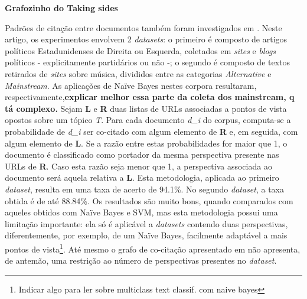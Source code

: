 \textbf{Grafozinho do Taking sides}

Padrões de citação entre documentos também foram investigados em \cite{efron}. Neste artigo, os experimentos envolvem 2 \emph{datasets}: o primeiro é composto de artigos políticos Estadunidenses de Direita ou Esquerda, coletados em \emph{sites} e \emph{blogs} políticos - explicitamente partidários ou não -; o segundo é composto de textos retirados de \emph{sites} sobre música, divididos entre as categorias \emph{Alternative} e \emph{Mainstream}. As aplicações de Naïve Bayes nestes corpora resultaram, respectivamente,\textbf{explicar melhor essa parte da coleta dos mainstream, q tá complexo.}
Sejam \textbf{L} e \textbf{R} duas listas de URLs associadas a pontos de vista opostos sobre um tópico \emph{T}. Para cada documento \emph{d\_i} do corpus, computa-se a probabilidade de \emph{d\_i} ser co-citado com algum elemento de \textbf{R} e, em seguida, com algum elemento de \textbf{L}. Se a razão entre estas probabilidades for maior que 1, o documento é classificado como portador da mesma perspectiva presente nas URLs de \textbf{R}. Caso esta razão seja menor que 1, a perspectiva associada ao documento será aquela relativa a \textbf{L}. Esta metodologia, aplicada ao primeiro \emph{dataset}, resulta em uma taxa de acerto de 94.1\%. No segundo \emph{dataset}, a taxa obtida é de até 88.84\%. Os resultados são muito bons, quando comparados com aqueles obtidos com Naïve Bayes e SVM, mas esta metodologia possui uma limitação importante: ela só é aplicável a \emph{datasets} contendo duas perspectivas, diferentemente, por exemplo, de um Naïve Bayes, facilmente adaptável a mais pontos de vista\footnote{Indicar algo para ler sobre multiclass text classif. com naive bayes}. Até mesmo o grafo de co-citação apresentado em \cite{malouf-taking_sides} não apresenta, de antemão, uma restrição ao número de perspectivas presentes no \emph{dataset}. 

